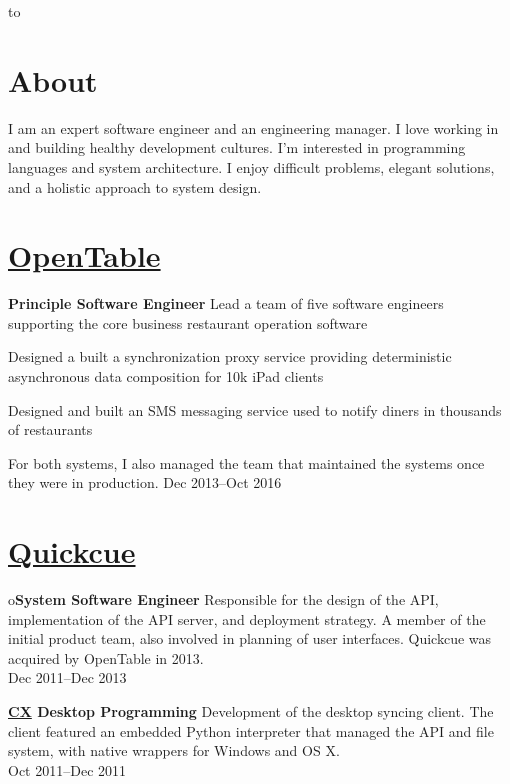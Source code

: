 \documentclass[margin]{res}
\begin{document}

\hbox to 

\begin{resume}
\section{About}

I am an expert software engineer and an engineering manager. I love
working in and building healthy development cultures. I'm interested
in programming languages and system architecture. I enjoy difficult
problems, elegant solutions, and a holistic approach to system design.

\section{\href{https://opentable.com/}{OpenTable}}

{\bf Principle Software Engineer}
%
Lead a team of five software engineers supporting the core business
restaurant operation software

Designed a built a synchronization proxy service providing
deterministic asynchronous data composition for 10k iPad clients

Designed and built an SMS messaging service used to notify diners in
thousands of restaurants

For both systems, I also managed the team that maintained the systems
once they were in production.
%
Dec 2013--Oct 2016

\section{\href{https://quickcue.com/}{Quickcue}}
o{\bf System Software Engineer}
%
Responsible for the design of the API, implementation of the API
server, and deployment strategy. A member of the initial product team,
also involved in planning of user interfaces. Quickcue was acquired by
OpenTable in 2013.\\
%
Dec 2011--Dec 2013

{\bf \href{https://www.cx.com/}{CX} Desktop Programming}
%
Development of the desktop syncing client. The client featured an
embedded Python interpreter that managed the API and file system, with
native wrappers for Windows and OS X.\\
%
Oct 2011--Dec 2011


\end{resume}
\end{document}
